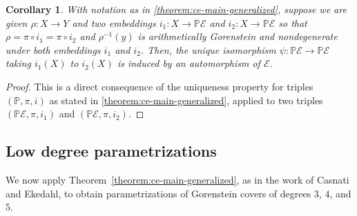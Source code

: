 \documentclass[12 pt]{amsart}
\theoremstyle{plain}
\newtheorem{corollary}[theorem]{Corollary}
\theoremstyle{definition}
\theoremstyle{remark}
\numberwithin{equation}{section}
\newcommand\bp{\mathbb P}
\newcommand\sce{\mathscr E}
\newcommand \ra{\rightarrow}
\begin{document}
\begin{corollary} \label{corollary:automorphism-of-e} With notation as in
	\autoref{theorem:ce-main-generalized}, suppose we are given $\rho: X \to
	Y$ and two embeddings $i_1: X \to \bp \sce$ and $i_2: X \to \bp \sce$ so that
	$\rho = \pi \circ i_1 = \pi \circ i_2$ and $\rho^{-1}(y)$ is
	arithmetically Gorenstein and nondegenerate under both embeddings $i_1$
and $i_2$. 
Then, the unique isomorphism $\psi: \bp \sce \to \bp \sce$ taking
$i_1(X)$ to $i_2(X)$ is induced by an automorphism of $\sce$.  
\end{corollary}
\begin{proof} 
	This is a direct consequence of the uniqueness property for triples
	$(\mathbb P, \pi, i)$ as stated in
	\autoref{theorem:ce-main-generalized}, applied to two triples $(\mathbb
	P \mathscr E, \pi, i_1)$ and $(\mathbb P \mathscr E, \pi, i_2)$.
\end{proof}



\subsection{Low degree parametrizations}
\label{subsection:low-degree-ce-structure-theorems}

We now apply Theorem~\ref{theorem:ce-main-generalized}, as in the work of Casnati and Ekedahl,
to obtain parametrizations of Gorenstein covers of degrees $3$, $4$, and $5$.

\end{document}
